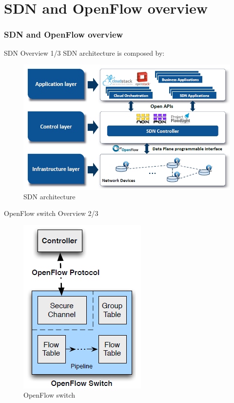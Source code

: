 \section{SDN and OpenFlow overview}
\frame
{
\frametitle{SDN and OpenFlow overview}
\tableofcontents[currentsection]
\addtocounter{framenumber}{-1}
}

\begin{frame}{SDN Overview \small{1/3}}
SDN architecture is composed by:
\begin{figure}
\includegraphics[scale=0.45]{Immagini/SDNStructure.png}
\caption{SDN architecture}
\label{fig:SDN-architecture}
\end{figure}
\end{frame}

\begin{frame}{OpenFlow switch Overview \small{2/3}}
\begin{figure}
\includegraphics[scale=0.45]{Immagini/OpenFlowSwitch.png}
\caption{OpenFlow switch}
\label{fig:OpenFlowSwitchComponent}
\end{figure}
\end{frame}

